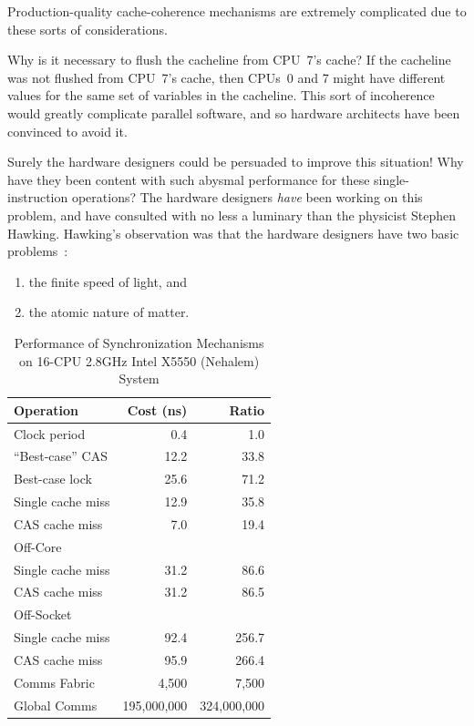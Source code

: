 	Production-quality cache-coherence mechanisms are extremely
	complicated due to these sorts of considerations.


\QuickQ{}
	Why is it necessary to flush the cacheline from CPU~7's cache?
\QuickA{}
	If the cacheline was not flushed from CPU~7's cache, then
	CPUs~0 and 7 might have different values for the same set
	of variables in the cacheline.
	This sort of incoherence would greatly complicate parallel
	software, and so hardware architects have been convinced to
	avoid it.

\QuickQ{}
	Surely the hardware designers could be persuaded to improve
	this situation!
	Why have they been content with such abysmal performance
	for these single-instruction operations?
\QuickA{}
	The hardware designers \emph{have} been working on this
	problem, and have consulted with no less a luminary than
	the physicist Stephen Hawking.
	Hawking's observation was that the hardware designers have
	two basic problems~\cite{BryanGardiner2007}:

	\begin{enumerate}
	\item	the finite speed of light, and
	\item	the atomic nature of matter.
	\end{enumerate}

\begin{table}
\centering
\begin{tabular}{l||r|r}
	Operation		& Cost (ns) 	& Ratio \\
	\hline
	\hline
	Clock period		&           0.4	&           1.0 \\
	\hline
	``Best-case'' CAS	&          12.2	&          33.8 \\
	\hline
	Best-case lock		&          25.6	&          71.2 \\
	\hline
	Single cache miss	&          12.9	&          35.8 \\
	\hline
	CAS cache miss		&           7.0	&          19.4 \\
	\hline
	Off-Core		&		&		\\
	\hline
	Single cache miss	&          31.2	&          86.6 \\
	\hline
	CAS cache miss		&          31.2	&          86.5 \\
	\hline
	Off-Socket		&		&		\\
	\hline
	Single cache miss	&          92.4	&         256.7 \\
	\hline
	CAS cache miss		&          95.9	&         266.4 \\
	\hline
	Comms Fabric		&       4,500	&       7,500 \\
	\hline
	Global Comms		& 195,000,000	& 324,000,000 \\
\end{tabular}
\caption{Performance of Synchronization Mechanisms on 16-CPU 2.8GHz Intel X5550 (Nehalem) System}
\label{tab:cpu:Performance of Synchronization Mechanisms on 16-CPU 2.8GHz Intel X5550 (Nehalem) System}
\end{table}


